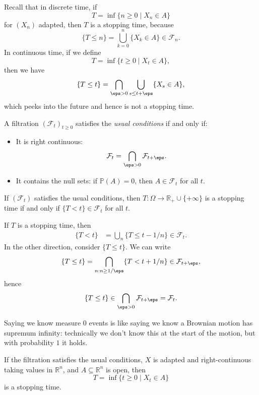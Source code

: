 \documentclass[12pt]{article}
\begin{document}
Recall that in discrete time, if
\[
	T = \inf\{n \geq 0 \mid X_n \in A\}
\]
for $(X_n)$ adapted, then $T$ is a stopping time, because
\[
	\{ T \leq n\} = \bigcup_{k = 0}^{n} \{X_k \in A\} \in \mathcal{F}_n.
\]
In continuous time, if we define
\[
	T = \inf \{t \geq 0 \mid X_t \in A\},
\]
then we have
\[
	\{T \leq t\} = \bigcap_{\eps > 0} \bigcup_{s \leq t + \eps} \{X_s \in A\},
\]
which peeks into the future and hence is not a stopping time.

\begin{definition}
	A filtration $(\mathcal{F}_t)_{t \geq 0}$ satisfies the \emph{usual conditions} if and only if:
	\begin{itemize}
		\item It is right continuous:
			\[
			\mathcal{F}_t = \bigcap_{\eps > 0} \mathcal{F}_{t + \eps}.
			\]
		\item It contains the null sets: if $\mathbb{P}(A) = 0$, then $A \in \mathcal{F}_t$ for all $t$.
	\end{itemize}
\end{definition}

\begin{proposition}
	If $(\mathcal{F}_t)$ satisfies the usual conditions, then $T : \Omega \to \mathbb{R}_+ \cup \{+\infty\}$ is a stopping time if and only if $\{T < t\} \in \mathcal{F}_t$ for all $t$.
\end{proposition}

\begin{proofbox}
	If $T$ is a stopping time, then 
	\begin{align*}
		\{T < t\} &= \bigcup_{n} \{T \leq t - 1/n\} \in \mathcal{F}_t.
	\end{align*}
	In the other direction, consider $\{T \leq t\}$. We can write
	\[
		\{T \leq t\} = \bigcap_{n : n \geq 1/\eps} \{T < t + 1/n\} \in \mathcal{F}_{t + \eps},
	\]
	hence
	\[
		\{T \leq t\} \in \bigcap_{\eps > 0} \mathcal{F}_{t + \eps} = \mathcal{F}_t.
	\]
\end{proofbox}

Saying we know measure 0 events is like saying we know a Brownian motion has supremum infinity: technically we don't know this at the start of the motion, but with probability $1$ it holds.

\begin{theorem}
	If the filtration satisfies the usual conditions, $X$ is adapted and right-continuous taking values in $\mathbb{R}^{n}$, and $A \subseteq \mathbb{R}^{n}$ is open, then
	\[
		T = \inf\{t \geq 0 \mid X_t \in A\}
	\]
	is a stopping time.
\end{theorem}
\end{document}
